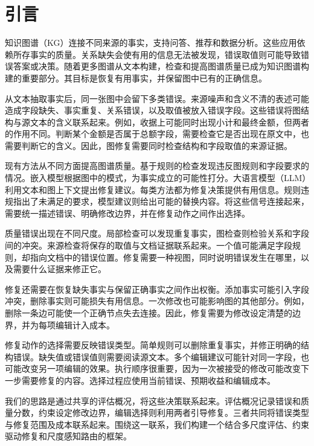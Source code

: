 \section{引言}
\label{sec:introduction}

知识图谱（KG）连接不同来源的事实，支持问答、推荐和数据分析\citep{ref_ji2021,ref_pan2023}。这些应用依赖所存事实的质量。关系缺失会使有用的信息无法被发现，错误取值则可能导致错误答案或决策。随着更多图谱从文本构建，检查和提高图谱质量已成为知识图谱构建的重要部分\citep{ref_zaveri2016,ref_paulheim2017}。其目标是恢复有用事实，并保留图中已有的正确信息。

从文本抽取事实后，同一张图中会留下多类错误。来源噪声和含义不清的表述可能造成字段缺失、事实重复、关系错误，以及取值被放入错误字段\citep{ref_ji2021,ref_paulheim2017}。这些错误将图结构与源文本的含义联系起来。例如，收据上可能同时出现小计和最终金额，但两者的作用不同。判断某个金额是否属于总额字段，需要检查它是否出现在原文中，也需要判断它的含义。因此，图修复需要同时检查结构和字段取值的来源证据。

现有方法从不同方面提高图谱质量。基于规则的检查发现违反图规则和字段要求的情况\citep{ref_kontokostas2014,ref_shacl2017}。嵌入模型根据图中的模式，为事实成立的可能性打分\citep{ref_bordes2013,ref_nickel2016}。大语言模型（LLM）利用文本和图上下文提出修复建议\citep{ref_pan2023,ref_lin2025}。每类方法都为修复决策提供有用信息。规则违规指出了未满足的要求，模型建议则给出可能的替换内容。将这些信号连接起来，需要统一描述错误、明确修改边界，并在修复动作之间作出选择。

质量错误出现在不同尺度。局部检查可以发现重复事实，图检查则检验关系和字段间的冲突。来源检查将保存的取值与文档证据联系起来\citep{ref_zaveri2016,ref_wang2021}。一个值可能满足字段规则，却指向文档中的错误位置。修复需要一种视图，同时说明错误发生在哪里，以及需要什么证据来修正它。

修复还需要在恢复缺失事实与保留正确事实之间作出权衡。添加事实可能引入字段冲突，删除事实则可能损失有用信息。一次修改也可能影响图的其他部分。例如，删除一条边可能使一个正确节点失去连接。因此，修复需要为修改设定清楚的边界，并为每项编辑计入成本。

修复动作的选择需要反映错误类型。简单规则可以删除重复事实，并修正明确的结构错误。缺失值或错误值则需要阅读源文本。多个编辑建议可能针对同一字段，也可能改变另一项编辑的效果。执行顺序很重要，因为一次被接受的修改可能改变下一步需要修复的内容。选择过程应使用当前错误、预期收益和编辑成本。

我们的思路是通过共享的评估概况，将这些决策联系起来。评估概况记录错误和质量分数，约束设定修改边界，编辑选择则利用两者引导修复。三者共同将错误类型与修复范围及成本联系起来。围绕这一联系，我们构建一个结合多尺度评估、约束驱动修复和尺度感知路由的框架。

